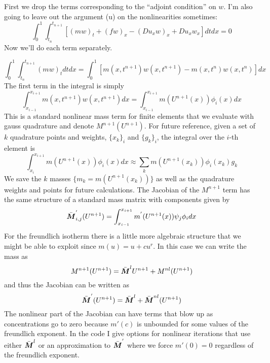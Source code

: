 \documentclass[10pt,dvips,twoside,reqno]{amsart}
\begin{document}
First we drop the terms corresponding to the ``adjoint condition'' on
$w$. I'm also going to leave out the argument (u) on the
nonlinearities sometimes:
\begin{equation} 
\int_0^1 \int_{t_n}^{t_{n+1}} [(mw)_t + (fw)_x - (Du_x w)_x + D u_x w_x ]dt dx =0 
\end{equation} 
Now we'll do each term separately.

\begin{equation} 
\int_0^1 \int_{t_n}^{t_{n+1}} (mw)_t dt dx = \int_0^1 [ m(x,t^{n+1})w(x,t^{n+1}) -m(x,t^{n})w(x,t^{n}) ] dx 
\end{equation}
The first term in the integral is simply 
\begin{equation} 
\int_{x_{i-1}}^{x_{i+1}} m(x,t^{n+1})w(x,t^{n+1}) dx  = \int_{x_{i-1}}^{x_{i+1}} m(U^{n+1}(x)) \phi_i(x) dx
\end{equation} 
This is a standard nonlinear mass term for finite elements that we
evaluate with gauss quadrature and denote $M^{n+1}(U^{n+1})$. For future reference, given a set of $k$ quadrature points and weights, $\{x_k\}_i$ and $\{g_k\}_i$, the integral over the $i$-th element is
\begin{equation}
\int_{x_{i}}^{x_{i+1}} m(U^{n+1}(x)) \phi_i(x) dx \approx \sum_k m(U^{n+1}(x_k)) \phi_i(x_k) g_k
\end{equation} 
We save the $k$ masses $\{m_k=m(U^{n+1}(x_k))\}$ as well as the quadrature weights and points for future calculations. The Jacobian of the $M^{n+1}$ term has the same structure of a standard mass matrix
with components given by
\begin{equation}
\bar{\mbox{{\boldmath ${M}$}}}^{'}_{i,j}(U^{n+1}) =  \int_{x_{i-1}}^{x_{i+1}} m^{'}(U^{n+1}(x)) \psi_{j} \phi_{i} dx
\end{equation}
For the freundlich isotherm there is a little more algebraic structure that we
might be able to exploit since $m(u) = u + c u^r$. In this case we can
write the mass as 
\begin{equation} 
M^{n+1}(U^{n+1}) = \bar{\mbox{{\boldmath ${M}$}}}^{l} U^{n+1} + M^{nl}(U^{n+1}) 
\end{equation} 
and thus the Jacobian can be written as 
\begin{equation} 
\bar{\mbox{{\boldmath ${M}$}}}^{'}(U^{n+1}) = \bar{\mbox{{\boldmath ${M}$}}}^{l} + \bar{\mbox{{\boldmath ${M}$}}}^{nl}(U^{n+1})
\end{equation} 
The nonlinear part of the Jacobian can have terms that blow up as
concentrations go to zero because $m'(c)$ is unbounded for some values
of the freundlich exponent. In the code I give options for nonlinear
iterations that use either $\bar{\mbox{{\boldmath ${M}$}}}^{l}$ or an approximation to $\bar{\mbox{{\boldmath ${M}$}}}^{'}$ where we force $m'(0) = 0$ regardless of the freundlich
exponent.
\end{document}
